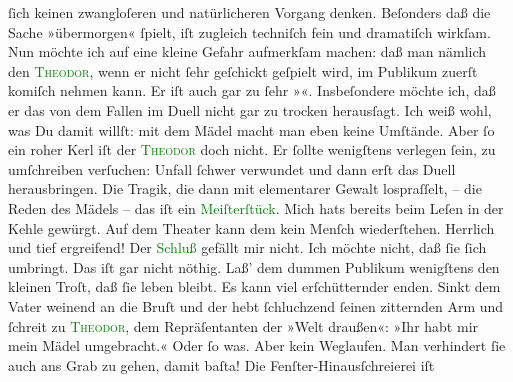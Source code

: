                ſich keinen zwangloſeren und natürlicheren {\pb}Vorgang
               denken. Beſonders daß die Sache »übermorgen« ſpielt, iſt zugleich techniſch fein und
               dramatiſch wirkſam. Nun möchte ich auf eine kleine Gefahr aufmerkſam machen: daß man
               nämlich den \textsc{\textcolor{green}{Theodor}{}}, wenn er nicht  ſehr geſchickt
               geſpielt wird, im Publikum zuerſt komiſch nehmen kann. Er iſt auch gar zu ſehr
                  »\label{K_L02726-1v}\label{K_L02726-1h}«. Insbeſondere
               möchte ich, daß er das von dem Fallen im Duell nicht gar zu trocken herausſagt. Ich
               weiß wohl, was Du damit willſt: mit {\pb}dem Mädel macht
               man eben keine Umſtände. Aber ſo ein roher Kerl iſt der \textsc{\textcolor{green}{Theodor}{}} doch nicht. Er ſollte wenigſtens verlegen ſein, zu umſchreiben verſuchen:
               Unfall {\dotsfour} ſchwer verwundet {\dotsfour} und
                   dann erſt das Duell herausbringen. Die Tragik,
               die dann mit elementarer Gewalt lospraſſelt, – die Reden des Mädels – das iſt ein \textcolor{green}{Meiſterſtück}{}. Mich hats bereits
               beim Leſen in der Kehle gewürgt. Auf dem Theater kann dem kein Menſch wiederſtehen.
               Herrlich und tief ergreifend! Der \textcolor{green}{Schluß}{} gefällt mir nicht. Ich möchte nicht, daß ſie ſich umbringt. Das iſt
                  {\pb}gar nicht nöthig. Laß’ dem dummen Publikum
               wenigſtens den kleinen Troſt, daß ſie leben bleibt. Es kann viel erſchütternder
               enden. Sinkt dem Vater weinend an die Bruſt und der hebt ſchluchzend ſeinen
               zitternden Arm und ſchreit zu \textsc{\textcolor{green}{Theodor}{}}, dem Repräſentanten der »Welt draußen«: »Ihr habt mir mein Mädel umgebracht.«
               Oder ſo was. Aber kein Weglaufen. Man verhindert \strikeout{\textcolor{gray}{ſod}} ſie auch ans Grab zu gehen, damit baſta! Die Fenſter-Hinausſchreierei iſt
